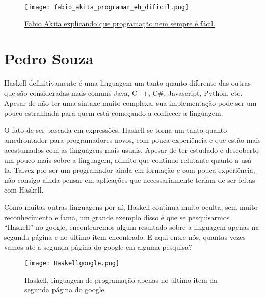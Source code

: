 \begin{apendicesenv}
    \begin{figure}[ht]
      \texttt{[image: fabio\_akita\_programar\_eh\_dificil.png]}
      \caption{\href{https://www.youtube.com/watch?v=V7oUDL7E1g4}{Fabio Akita explicando que programação nem sempre é fácil.}}
    \end{figure}

    \newpage

    \chapter{Pedro Souza}

    Haskell definitivamente é uma linguagem um tanto quanto diferente das outras que são consideradas mais comuns Java, C++, C\#, Javascript,
    Python, etc. Apesar de não ter uma sintaxe muito complexa, sua implementação pode ser um pouco estranhada para quem está começando a conhecer
    a linguagem. 

    O fato de ser baseada em expressões, Haskell se torna um tanto quanto amedrontador para programadores novos, com pouca experiência e que estão
    mais acostumados com as linguagens mais usuais. Apesar de ter estudado e descoberto um pouco mais sobre a linguagem, admito que continuo 
    relutante quanto a usá-la. Talvez por ser um programador ainda em formação e com pouca experiência, não consigo ainda pensar em aplicações 
    que necessariamente teriam de ser feitas com Haskell.

    Como muitas outras linguagens por aí, Haskell continua muito oculta, sem muito reconhecimento e fama, um grande exemplo disso é que se pesquisarmos
    ``Haskell'' no google, encontraremos algum resultado sobre a linguagem apenas na segunda página e no último item encontrado. E aqui entre nós, quantas vezes vamos
    até a segunda página do google em alguma pesquisa?

    \begin{figure}[ht]
        \centering 
        \texttt{[image: Haskellgoogle.png]}
        \caption{Haskell, linguagem de programação apenas no último item da segunda página do google}
    \end{figure}

\end{apendicesenv}